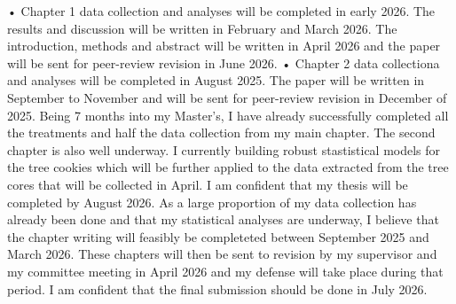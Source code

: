 \documentclass[11pt,letter]{article}
\begin{document}
• Chapter 1 data collection and analyses will be completed in early 2026. The results and discussion will be written in February and March 2026. The introduction, methods and abstract will be written in April 2026 and the paper will be sent for peer-review revision in June 2026.
• Chapter 2 data collectiona and analyses will be completed in August 2025. The paper will be written in September to November and will be sent for peer-review revision in December of 2025.
Being 7 months into my Master’s, I have already successfully completed all the treatments and half the data collection from my main chapter. The second chapter is also well underway. I currently building robust stastistical models for the tree cookies which will be further applied to the data extracted from the tree cores that will be collected in April.
I am confident that my thesis will be completed by August 2026. As a large proportion of my data collection has already been done and that my statistical analyses are underway, I believe that the chapter writing will feasibly be completeted between September 2025 and March 2026. These chapters will then be sent to revision by my supervisor and my committee meeting in April 2026 and my defense will take place during that period. I am confident that the final submission should be done in July 2026.

\end{document}
